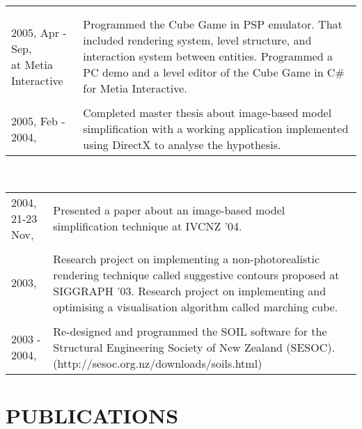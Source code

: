 \begin{resume}
\begin{tabular}{ll}
{}\\\\
\parbox[t]{35mm}{2005, Apr - Sep,\\at Metia Interactive} & \parbox[t]{111mm}{

Programmed the Cube Game in PSP emulator. That included rendering system, level structure, and interaction system between entities. Programmed a PC demo and a level editor of the Cube Game in C\# for Metia Interactive.

}\\\\
\parbox[t]{35mm}{2005, Feb - \\ 2004,} & \parbox[t]{111mm}{

Completed master thesis about image-based model simplification with a working application implemented using DirectX to analyse the hypothesis.

}\end{tabular}\\
\begin{tabular}{ll}
\parbox[t]{35mm}{2004, 21-23 Nov,} & \parbox[t]{111mm}{

Presented a paper about an image-based model simplification technique at IVCNZ '04.

}\\\\
\parbox[t]{35mm}{2003,} & \parbox[t]{111mm}{

Research project on implementing a non-photorealistic rendering technique called suggestive contours proposed at SIGGRAPH '03. Research project on implementing and optimising a visualisation algorithm called marching cube.

}\\\\
\parbox[t]{35mm}{2003 - 2004,} & \parbox[t]{111mm}{

Re-designed and programmed the SOIL software for the Structural Engineering Society of New Zealand (SESOC).\\(http://sesoc.org.nz/downloads/soils.html)

}\end{tabular} 

\vspace{0.15in} 

\section{PUBLICATIONS} 
\vspace{0.1in}


\end{resume}
